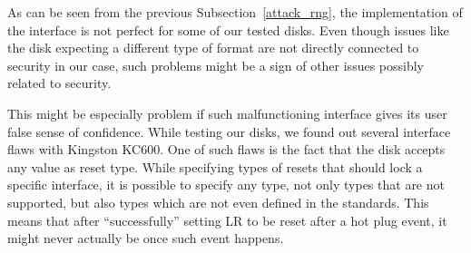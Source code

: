 \REPLACEME

As can be seen from the previous Subsection~\ref{attack_rng}, the implementation of the interface is not perfect for some of our tested disks. Even though issues like the disk expecting a different type of format are not directly connected to security in our case, such problems might be a sign of other issues possibly related to security.

This might be especially problem if such malfunctioning interface gives its user false sense of confidence. While testing our disks, we found out several interface flaws with Kingston KC600. One of such flaws is the fact that the disk accepts any value as reset type. While specifying types of resets that should lock a specific interface, it is possible to specify any type, not only types that are not supported, but also types which are not even defined in the standards. This means that after ``successfully'' setting LR to be reset after a hot plug event, it might never actually be once such event happens.





